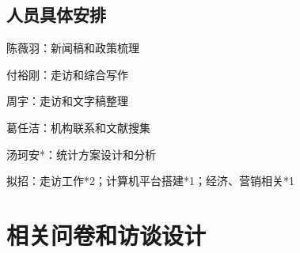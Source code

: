 \documentclass{article}
\begin{document}
\subsection{人员具体安排}
陈薇羽：新闻稿和政策梳理

付裕刚：走访和综合写作

周宇：走访和文字稿整理

葛任洁：机构联系和文献搜集

汤珂安*：统计方案设计和分析

拟招：走访工作*2；计算机平台搭建*1；经济、营销相关*1

    \section{相关问卷和访谈设计}

    
    
    \begin{spacing}{0.9}
            
        
\end{spacing}
\end{document}
